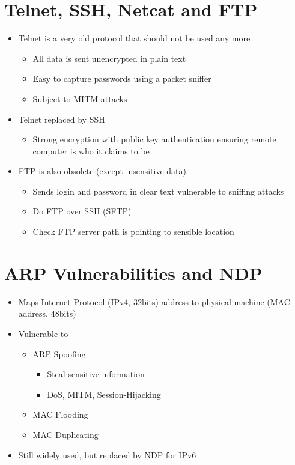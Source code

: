 \documentclass{article}[18pt]
\begin{document}
\section{Telnet, SSH, Netcat and FTP}
\begin{itemize}
	\item Telnet is a very old protocol that should not be used any more
	\begin{itemize}
		\item All data is sent unencrypted in plain text
		\item Easy to capture passwords using a packet sniffer
		\item Subject to MITM attacks
	\end{itemize}
	\item Telnet replaced by SSH
	\begin{itemize}
		\item Strong encryption with public key authentication ensuring remote computer is who it claims to be
	\end{itemize}
	\item FTP is also obsolete (except insensitive data)
	\begin{itemize}
		\item Sends login and password in clear text vulnerable to sniffing attacks
		\item Do FTP over SSH (SFTP)
		\item Check FTP server path is pointing to sensible location
	\end{itemize}
\end{itemize}
\section{ARP Vulnerabilities and NDP}
\begin{itemize}
	\item Maps Internet Protocol (IPv4, 32bits) address to physical machine (MAC address, 48bits)
	\item Vulnerable to
	\begin{itemize}
		\item ARP Spoofing
		\begin{itemize}
			\item Steal sensitive information
			\item DoS, MITM, Session-Hijacking
		\end{itemize}
		\item MAC Flooding
		\item MAC Duplicating
	\end{itemize}
	\item Still widely used, but replaced by NDP for IPv6
\end{itemize}
\end{document}
